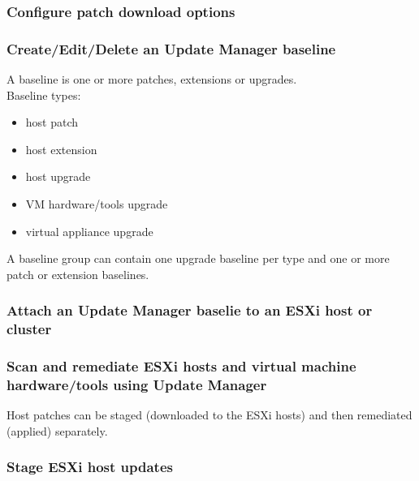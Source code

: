 \subsubsection{Configure patch download options}

\subsubsection{Create/Edit/Delete an Update Manager baseline}

A baseline is one or more patches, extensions or upgrades.\\

Baseline types:

\begin{itemize}
\item host patch
\item host extension
\item host upgrade
\item VM hardware/tools upgrade
\item virtual appliance upgrade
\end{itemize}

A baseline group can contain one upgrade baseline per type and one or more
patch or extension baselines.

\subsubsection{Attach an Update Manager baselie to an ESXi host or cluster}

\subsubsection{Scan and remediate ESXi hosts and virtual machine hardware/tools using Update Manager}

Host patches can be staged (downloaded to the ESXi hosts) and then remediated
(applied) separately.

\subsubsection{Stage ESXi host updates}
